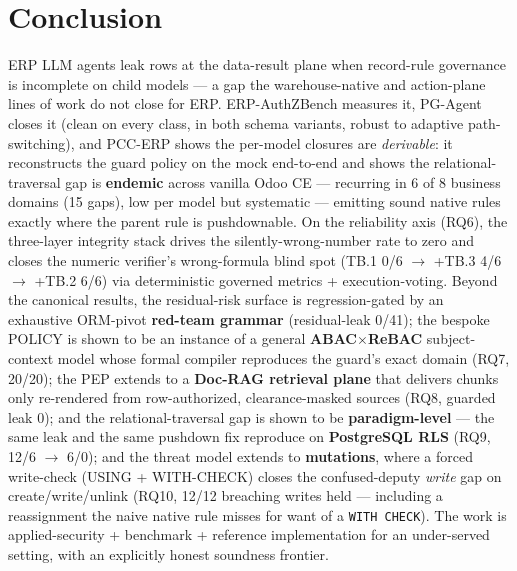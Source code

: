 \documentclass[11pt,a4paper]{article}
\newcommand{\code}[1]{\texttt{#1}}
\begin{document}
\section{Conclusion}
ERP LLM agents leak rows at the data-result plane when record-rule governance is incomplete on child models ---
a gap the warehouse-native and action-plane lines of work do not close for ERP. ERP-AuthZBench measures it,
PG-Agent closes it (clean on every class, in both schema variants, robust to adaptive path-switching), and
PCC-ERP shows the per-model closures are \emph{derivable}: it reconstructs the guard policy on the mock
end-to-end and shows the relational-traversal gap is \textbf{endemic} across vanilla Odoo CE --- recurring in
6 of 8 business domains (15 gaps), low per model but systematic --- emitting sound native rules exactly where
the parent rule is pushdownable. On the reliability axis (RQ6), the three-layer integrity stack
drives the silently-wrong-number rate to zero and closes the numeric verifier's wrong-formula blind spot (TB.1
0/6 $\to$ +TB.3 4/6 $\to$ +TB.2 6/6) via deterministic governed metrics + execution-voting. Beyond the
canonical results, the residual-risk surface is regression-gated by an exhaustive ORM-pivot \textbf{red-team
grammar} (residual-leak 0/41); the bespoke POLICY is shown to be an instance of a general
\textbf{ABAC$\times$ReBAC} subject-context model whose formal compiler reproduces the guard's exact domain
(RQ7, 20/20); the PEP extends to a \textbf{Doc-RAG retrieval plane} that delivers chunks only re-rendered
from row-authorized, clearance-masked sources (RQ8, guarded leak 0); and the relational-traversal gap is shown
to be \textbf{paradigm-level} --- the same leak and the same pushdown fix reproduce on \textbf{PostgreSQL RLS}
(RQ9, 12/6 $\to$ 6/0); and the threat model extends to \textbf{mutations}, where a forced write-check
(USING + WITH-CHECK) closes the confused-deputy \emph{write} gap on create/write/unlink (RQ10, 12/12 breaching
writes held --- including a reassignment the naive native rule misses for want of a \code{WITH CHECK}). The work
is applied-security + benchmark + reference implementation for an under-served setting, with an explicitly honest
soundness frontier.
\end{document}
